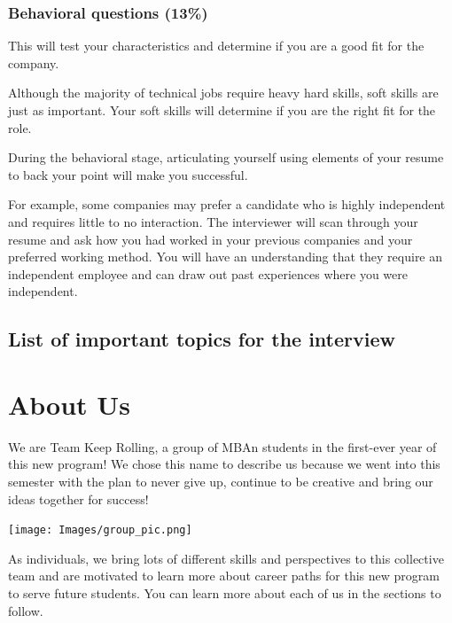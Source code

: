 \documentclass[
]{book}
\begin{document}
\hypertarget{behavioral-questions-13-1}{%
\subsection{Behavioral questions (13\%)}\label{behavioral-questions-13-1}}

This will test your characteristics and determine if you are a good fit for the company.

Although the majority of technical jobs require heavy hard skills, soft skills are just as important. Your soft skills will determine if you are the right fit for the role.

During the behavioral stage, articulating yourself using elements of your resume to back your point will make you successful.

For example, some companies may prefer a candidate who is highly independent and requires little to no interaction. The interviewer will scan through your resume and ask how you had worked in your previous companies and your preferred working method. You will have an understanding that they require an independent employee and can draw out past experiences where you were independent.

\hypertarget{list-of-important-topics-for-the-interview}{%
\section{List of important topics for the interview}\label{list-of-important-topics-for-the-interview}}

\hypertarget{about-us-1}{%
\chapter*{About Us}\label{about-us-1}}

We are Team Keep Rolling, a group of MBAn students in the first-ever year of this new program! We chose this name to describe us because we went into this semester with the plan to never give up, continue to be creative and bring our ideas together for success!

\texttt{[image: Images/group\_pic.png]}

As individuals, we bring lots of different skills and perspectives to this collective team and are motivated to learn more about career paths for this new program to serve future students. You can learn more about each of us in the sections to follow.
\end{document}
